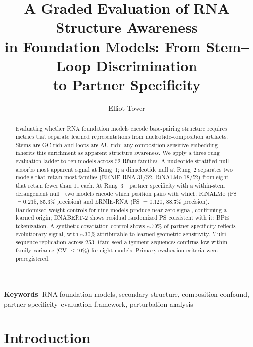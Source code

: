 \documentclass[11pt]{article}
\title{A Graded Evaluation of RNA Structure Awareness\\in Foundation Models: From Stem--Loop Discrimination\\to Partner Specificity}
\author{Elliot Tower}
\affil{Independent researcher \\ \texttt{elliot@elliottower.ai}}
\date{}
\begin{document}
\maketitle

\noindent\textbf{Keywords:} RNA foundation models, secondary structure, composition confound, partner specificity, evaluation framework, perturbation analysis

\begin{abstract}
Evaluating whether RNA foundation models encode base-pairing structure
requires metrics that separate learned representations from
nucleotide-composition artifacts. Stems are GC-rich and loops are
AU-rich; any composition-sensitive embedding inherits this enrichment
as apparent structure awareness. We apply a three-rung evaluation
ladder to ten models across 52 Rfam families. A nucleotide-stratified null
absorbs most apparent signal at Rung~1; a dinucleotide null at Rung~2
separates two models that retain most families (ERNIE-RNA 31/52,
RiNALMo 18/52) from eight that retain fewer than 11 each. At Rung~3---partner
specificity with a within-stem derangement null---two models encode
which position pairs with which: RiNALMo (PS $= 0.215$, 85.3\%
precision) and ERNIE-RNA (PS $= 0.120$, 88.3\% precision).
Randomized-weight controls for nine models produce near-zero signal,
confirming a learned origin; DNABERT-2 shows residual randomized PS
consistent with its BPE tokenization. A synthetic covariation control shows $\sim$70\% of partner
specificity reflects evolutionary signal, with $\sim$30\% attributable
to learned geometric sensitivity.
Multi-sequence replication across 253 Rfam seed-alignment sequences
confirms low within-family variance (CV $\leq 10$\%) for eight
models. Primary evaluation criteria were preregistered.
\end{abstract}

\section{Introduction}
\label{sec:intro}
\end{document}
